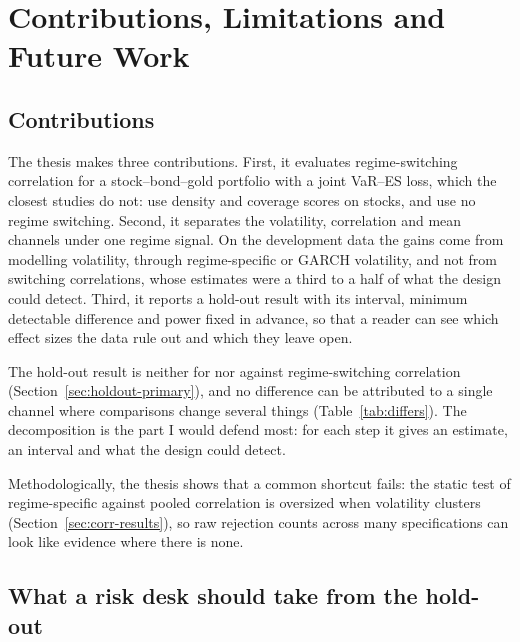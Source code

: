 \section{Contributions, Limitations and Future Work}\label{ch:discussion}

\subsection{Contributions}\label{sec:disc-contrib}

The thesis makes three contributions. First, it evaluates regime-switching correlation for a stock--bond--gold portfolio with a joint VaR--ES loss, which the closest studies do not: \citet{paolella2019} use density and coverage scores on stocks, and \citet{fortin2023} use no regime switching. Second, it separates the volatility, correlation and mean channels under one regime signal. On the development data the gains come from modelling volatility, through regime-specific or GARCH volatility, and not from switching correlations, whose estimates were a third to a half of what the design could detect. Third, it reports a hold-out result with its interval, minimum detectable difference and power fixed in advance, so that a reader can see which effect sizes the data rule out and which they leave open.

The hold-out result is neither for nor against regime-switching correlation (Section~\ref{sec:holdout-primary}), and no difference can be attributed to a single channel where comparisons change several things (Table~\ref{tab:differs}). The decomposition is the part I would defend most: for each step it gives an estimate, an interval and what the design could detect.

Methodologically, the thesis shows that a common shortcut fails: the static test of regime-specific against pooled correlation is oversized when volatility clusters (Section~\ref{sec:corr-results}), so raw rejection counts across many specifications can look like evidence where there is none.

\subsection{What a risk desk should take from the hold-out}\label{sec:disc-calib}

